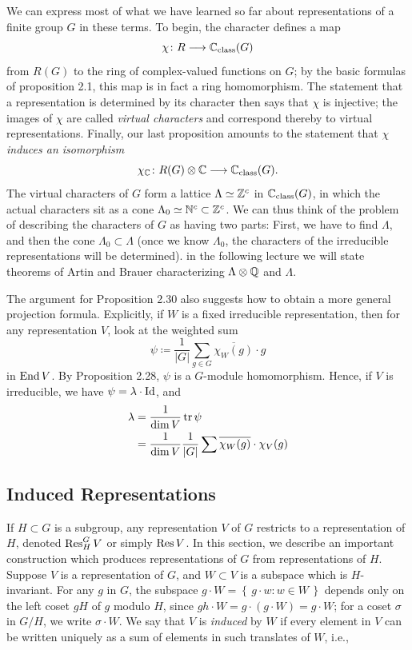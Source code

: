 We can express most of what we have learned so far about representations of
a finite group $G$ in these terms. To begin, the character defines a map
\[
\chi\colon R\longrightarrow\mathbb{C}_{\text{class}}(G)
\]
from $R(G)$ to the ring of complex-valued functions on $G$; by the basic
formulas of proposition 2.1, this map is in fact a ring homomorphism. The
statement that a representation is determined by its character then says
that $\chi$ is injective; the images of $\chi$ are called \emph{virtual
  characters} and correspond thereby to virtual representations. Finally,
our last proposition amounts to the statement that $\chi$ \emph{induces an
  isomorphism}
\[
\chi_{\mathbb{C}}\colon R(G)\otimes\mathbb{C}\longrightarrow\mathbb{C}_{\text{class}}(G).
\]
The virtual characters of $G$ form a lattice $\Lambda\simeq\mathbb{Z}^c$ in
$\mathbb{C}_{\text{class}}(G)$, in which the actual characters sit as a cone
$\Lambda_0\simeq\mathbb{N}^c\subset\mathbb{Z}^c$. We can thus think of the problem of
describing the characters of $G$ as having two parts: First, we have to
find $\Lambda$, and then the cone $\Lambda_0\subset\Lambda$ (once we know
$\Lambda_0$, the characters of the irreducible representations will be
determined). in the following lecture we will state theorems of Artin and
Brauer characterizing $\Lambda\otimes\mathbb{Q}$ and $\Lambda$.

The argument for Proposition 2.30 also suggests how to obtain a more
general projection formula. Explicitly, if $W$ is a fixed irreducible
representation, then for any representation $V$, look at the weighted sum
\[
\psi\coloneq\frac{1}{|G|}\sum_{g\in G}\overline{\chi_W(g)}\cdot g
\]
in $\operatorname{End} V$. By Proposition 2.28, $\psi$ is a $G$-module
homomorphism. Hence, if $V$ is irreducible, we have $\psi=\lambda\cdot\operatorname{Id}$,
and
\begin{align*}
  \lambda&=\frac{1}{\dim V}\operatorname{tr}\psi\\
         &=\frac{1}{\dim V}\frac{1}{|G|}\sum\overline{\chi_W(g)}\cdot\chi_V(g)
\end{align*}

\subsection{Induced Representations}
If $H\subset G$ is a subgroup, any representation $V$ of $G$ restricts to a
representation of $H$, denoted $\operatorname{Res}_H^G V$ or simply $\operatorname{Res} V$. In this
section, we describe an important construction which produces
representations of $G$ from representations of $H$. Suppose $V$ is a
representation of $G$, and $W\subset V$ is a subspace which is
$H$-invariant. For any $g$ in $G$, the subspace
$g\cdot W=\left\{\,g\cdot w:w\in W\,\right\}$ depends only on the left
coset $gH$ of $g$ modulo $H$, since $gh\cdot W=g\cdot(g\cdot W)=g\cdot W$;
for a coset $\sigma$ in $G/H$, we write $\sigma\cdot W$. We say that $V$ is
\emph{induced} by $W$ if every element in $V$ can be written uniquely as a
sum of elements in such translates of $W$, i.e.,

